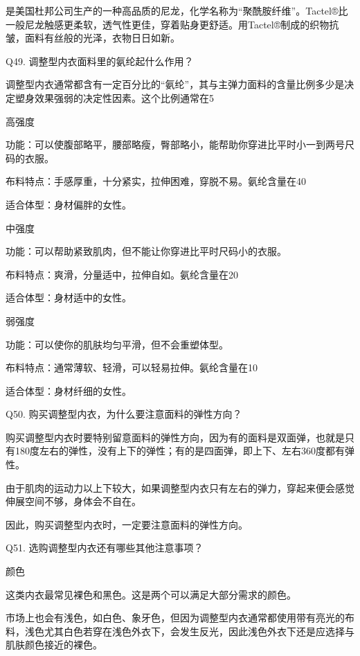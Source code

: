 \documentclass[12pt,UTF8]{ctexbook}
\begin{document}
是美国杜邦公司生产的一种高品质的尼龙，化学名称为“聚酰胺纤维”。Tactel®比一般尼龙触感更柔软，透气性更佳，穿着贴身更舒适。用Tactel®制成的织物抗皱，面料有丝般的光泽，衣物日日如新。





Q49. 调整型内衣面料里的氨纶起什么作用？


调整型内衣通常都含有一定百分比的“氨纶”，其与主弹力面料的含量比例多少是决定塑身效果强弱的决定性因素。这个比例通常在5%

高强度

功能：可以使腹部略平，腰部略瘦，臀部略小，能帮助你穿进比平时小一到两号尺码的衣服。

布料特点：手感厚重，十分紧实，拉伸困难，穿脱不易。氨纶含量在40%

适合体型：身材偏胖的女性。

中强度

功能：可以帮助紧致肌肉，但不能让你穿进比平时尺码小的衣服。

布料特点：爽滑，分量适中，拉伸自如。氨纶含量在20%

适合体型：身材适中的女性。

弱强度

功能：可以使你的肌肤均匀平滑，但不会重塑体型。

布料特点：通常薄软、轻滑，可以轻易拉伸。氨纶含量在10%

适合体型：身材纤细的女性。





Q50. 购买调整型内衣，为什么要注意面料的弹性方向？


购买调整型内衣时要特别留意面料的弹性方向，因为有的面料是双面弹，也就是只有180度左右的弹性，没有上下的弹性；有的是四面弹，即上下、左右360度都有弹性。

由于肌肉的运动力以上下较大，如果调整型内衣只有左右的弹力，穿起来便会感觉伸展空间不够，身体会不自在。

因此，购买调整型内衣时，一定要注意面料的弹性方向。





Q51. 选购调整型内衣还有哪些其他注意事项？


颜色

这类内衣最常见裸色和黑色。这是两个可以满足大部分需求的颜色。

市场上也会有浅色，如白色、象牙色，但因为调整型内衣通常都使用带有亮光的布料，浅色尤其白色若穿在浅色外衣下，会发生反光，因此浅色外衣下还是应选择与肌肤颜色接近的裸色。
\end{document}
